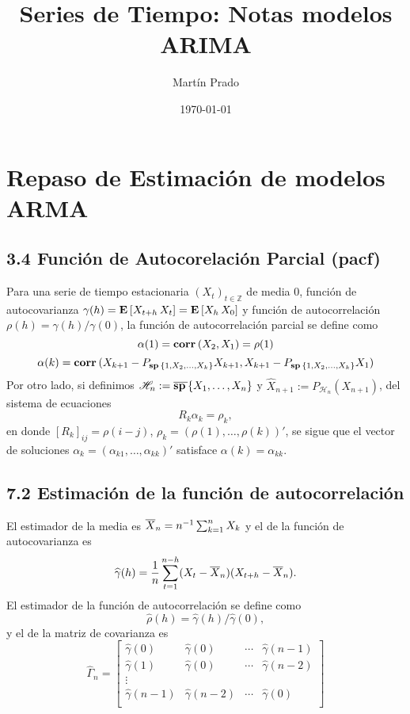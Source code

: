 \documentclass[11pt]{article}
\title{Series de Tiempo: Notas modelos ARIMA}
\author{Martín Prado}
\date{\AdvanceDate[-1]\today} %
\def\Z{\ensuremath{\mathbb{Z}}}
\def\E{\ensuremath{\textbf{E\,}}}
\def\corr{\ensuremath{\textbf{corr\,}}}
\def\sp{\ensuremath{\textbf{sp\,}}}
\def\HH{\ensuremath{\mathscr{H}}}
\theoremstyle{definition}
\def\ol{\ensuremath{\overline}}
\newcommand\wh[1]{\widehat{#1}}
\begin{document}
\maketitle

\section{Repaso de Estimación de modelos ARMA}

\subsection*{3.4 Función de Autocorelación Parcial (pacf)}

Para una serie de tiempo estacionaria $(X_t)_{t \in \Z}$ de media $0$, función de autocovarianza $\gamma(h) = \E[X_{t+h}\, X_{t}] = \E[X_{h}\, X_{0}]$ y función de autocorrelación $\rho(h) = \gamma(h)/\gamma(0)$, la función de autocorrelación parcial se define como
\[ \alpha(1) = \corr(X_2, X_1) = \rho(1) \]
\[ \alpha(k) = \corr(X_{k+1} - P_{\sp\{1,X_2,\ldots,X_k\}}X_{k+1}, X_{k+1} - P_{\sp\{1,X_2,\ldots,X_k\}}X_{1}) \]
Por otro lado, si definimos $\HH_n := \ol{\sp}\{X_1,\ldots,X_n\}$ y $\wh{X}_{n+1} := P_{\HH_n}(X_{n+1})$, del sistema de ecuaciones
\[ R_k \alpha_k = \rho_k, \]
en donde $[R_k]_{ij} = \rho(i-j)$, $\rho_k = (\rho(1),\ldots, \rho(k))'$, se sigue que el vector de soluciones $\alpha_k = (\alpha_{k1},\ldots, \alpha_{kk})'$ satisface $\alpha(k) = \alpha_{kk}$.

\subsection*{7.2 Estimación de la función de autocorrelación}
El estimador de la media es $\ol{X}_n = n^{-1}\sum_{k = 1}^n X_k$ y el de la función de autocovarianza es
\[ \wh{\gamma}(h) = \frac{1}{n} \sum_{t = 1}^{n-h} (X_t - \ol{X}_n)(X_{t+h}-\ol{X}_n).\]
El estimador de la función de autocorrelación se define como
\[ \wh{\rho}(h) = \wh{\gamma}(h)/\wh{\gamma}(0), \]
y el de la matriz de covarianza es
\[ \wh{\Gamma}_n = \left[ \begin{matrix}
    \wh{\gamma}(0) & \wh{\gamma}(0) & \cdots & \wh{\gamma}(n-1)\\
    \wh{\gamma}(1) & \wh{\gamma}(0) & \cdots & \wh{\gamma}(n-2)\\
    \vdots\\
    \wh{\gamma}(n-1) & \wh{\gamma}(n-2) & \cdots & \wh{\gamma}(0)\\
\end{matrix} \right] \]
\end{document}
